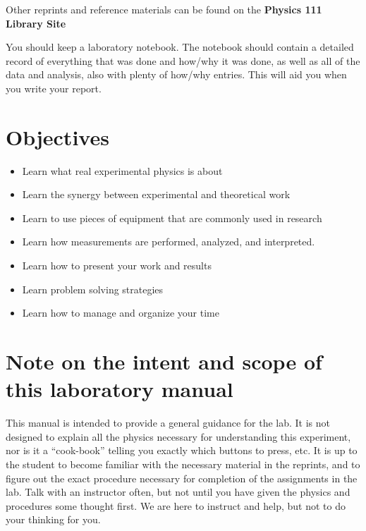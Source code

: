 \documentclass{../lab}
\begin{document}
\noindent Other reprints and reference materials can be found on the \textbf{Physics 111 Library Site}

You should keep a laboratory notebook. The notebook should contain a detailed record of everything that was done and how/why it was done, as well as all of the data and analysis, also with plenty of how/why entries. This will aid you when you write your report.

\section{Objectives}

\begin{itemize}
    \item Learn what real experimental physics is about

    \item Learn the synergy between experimental and theoretical work

    \item Learn to use pieces of equipment that are commonly used in research

    \item Learn how measurements are performed, analyzed, and interpreted.

    \item Learn how to present your work and results

    \item Learn problem solving strategies

    \item Learn how to manage and organize your time

\end{itemize}

\section{Note on the intent and scope of this laboratory manual}

This manual is intended to provide a general guidance for the lab. It is not designed to explain all the physics necessary for understanding this experiment, nor is it a ``cook-book'' telling you exactly which buttons to press, etc. It is up to the student to become familiar with the necessary material in the reprints, and to figure out the exact procedure necessary for completion of the assignments in the lab. Talk with an instructor often, but not until you have given the physics and procedures some thought first. We are here to instruct and help, but not to do your thinking for you.
\end{document}
